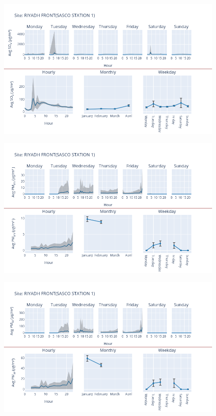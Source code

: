 \documentclass[12pt, oneside]{book}
\begin{document}
{ 
{\begin{figure}[H] 
 \centering 
\includegraphics[width=.88\textwidth, keepaspectratio]{image125} 
 \end{figure}}{} 

{\begin{figure}[H] 
 \centering 
\includegraphics[width=.88\textwidth, keepaspectratio]{image126} 
 \end{figure}}{} 

{\begin{figure}[H] 
 \centering 
\includegraphics[width=.88\textwidth, keepaspectratio]{image127} 
 \end{figure}}{} 

}
\end{document}
